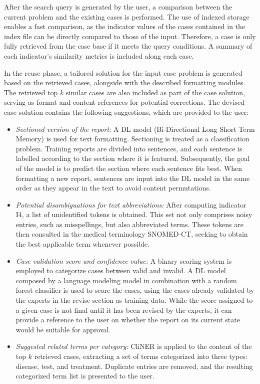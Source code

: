After the search query is generated by the user, a comparison between the current problem and the existing cases is performed. The use of indexed storage enables a fast comparison, as the indicator values of the cases contained in the index file can be directly compared to those of the input. Therefore, a case is only fully retrieved from the case base if it meets the query conditions. A summary of each indicator's similarity metrics is included along each case. 

In the reuse phase, a tailored solution for the input case problem is generated based on the retrieved cases, alongside with the described formatting modules. The retrieved top $k$ similar cases are also included as part of the case solution, serving as format and content references for potential corrections. The devised case solution contains the following suggestions, which are provided to the user:
\begin{itemize}
    \item \textit{Sectioned version of the report:} A DL model (Bi-Directional Long Short Term Memory) is used for text formatting. Sectioning is treated as a classification problem. Training reports are divided into sentences, and each sentence is labelled according to the section where it is featured. Subsequently, the goal of the model is to predict the section where each sentence fits best. When formatting a new report, sentences are input into the DL model in the same order as they appear in the text to avoid content permutations.
    
    \item \textit{Potential disambiguations for text abbreviations:} After computing indicator I4, a list of unidentified tokens is obtained. This set not only comprises noisy entries, such as misspellings, but also abbreviated terms. These tokens are then consulted in the medical terminology SNOMED-CT, seeking to obtain the best applicable term whenever possible.
    
    \item \textit{Case validation score and confidence value:} A binary scoring system is employed to categorize cases between valid and invalid. A DL model composed by a language modeling model in combination with a random forest classifier is used to score the cases, using the cases already validated by the experts in the revise section as training data. While the score assigned to a given case is not final until it has been revised by the experts, it can provide a reference to the user on whether the report on its current state would be suitable for approval. 
    
    \item \textit{Suggested related terms per category:} CliNER is applied to the content of the top $k$ retrieved cases, extracting a set of terms categorized into three types: disease, test, and treatment. Duplicate entries are removed, and the resulting categorized term list is presented to the user.
\end{itemize}

